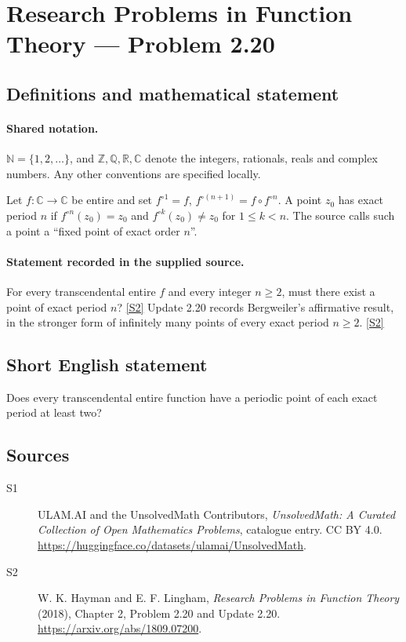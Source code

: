 \documentclass[11pt]{article}
\newcommand{\sref}[2]{\hyperlink{source:#1:#2}{[S#2]}}
\begin{document}
\section{Research Problems in Function Theory — Problem 2.20}\label{statement}

\subsection{Definitions and mathematical statement}

\paragraph{Shared notation.}$\mathbb N=\{1,2,\ldots\}$, and $\mathbb Z,\mathbb Q,\mathbb R,\mathbb C$ denote the integers, rationals, reals and complex numbers. Any other conventions are specified locally.


Let $f:\mathbb C\to\mathbb C$ be entire and set $f^{\circ1}=f$, $f^{\circ(n+1)}=f\circ f^{\circ n}$.
A point $z_0$ has exact period $n$ if $f^{\circ n}(z_0)=z_0$ and $f^{\circ k}(z_0)\ne z_0$ for $1\le k<n$.
The source calls such a point a ``fixed point of exact order $n$''.

\paragraph{Statement recorded in the supplied source.}
For every transcendental entire $f$ and every integer $n\ge2$, must there exist a point of exact period $n$? \sref{statement}{2}
Update 2.20 records Bergweiler's affirmative result, in the stronger form of infinitely many points of every exact period $n\ge2$. \sref{statement}{2}
\subsection{Short English statement}
Does every transcendental entire function have a periodic point of each exact period at least two?
\subsection{Sources}
\begin{description}
\item[\hypertarget{source:statement:1}{S1}] ULAM.AI and the UnsolvedMath Contributors, \emph{UnsolvedMath: A Curated Collection of Open Mathematics Problems}, catalogue entry. CC BY 4.0. \url{https://huggingface.co/datasets/ulamai/UnsolvedMath}.
\item[\hypertarget{source:statement:2}{S2}] W. K. Hayman and E. F. Lingham, \emph{Research Problems in Function Theory} (2018), Chapter 2, Problem 2.20 and Update 2.20. \url{https://arxiv.org/abs/1809.07200}.
\end{description}
\label{end:statement}
\end{document}
